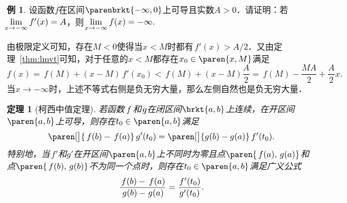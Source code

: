 \documentclass[a4paper,punct=CCT]{ctexbook}
\makeatletter
\newtheorem{theorem}{定理}
\theoremstyle{definition}
\newtheorem*{example*}{例}
\theoremstyle{remark}
\renewcommand*{\proofname}{证}
\renewenvironment{proof}[1][\proofname]{\par
  \pushQED{\qed}%
  \normalfont \topsep6\p@\@plus6\p@\relax
  \trivlist
  \item[\hskip\labelsep
    \bfseries
    #1%
    ]\ignorespaces
}{%
  \popQED\endtrivlist\@endpefalse
}
\makeatother
\begin{document}
\begin{example*}
  设函数\(f\)在区间\(\parenbrkt{-\infty,0}\)上可导且实数\(A > 0\)．请证明：若\(\negthickspace\lim\limits_{x\to-\infty} f'(x) = A\)，则
  \begin{math}
    \negthickspace\lim\limits_{x\to-\infty} f(x) = -\infty.
  \end{math}

  \begin{proof}
    由极限定义可知，存在\(M < 0\)使得当\(x < M\)时都有\(\,f'(x) > A/2\)．又由定理~\ref{thm:lmvt}可知，对于任意的\(x < M\)都存在\(x_0 \in \paren{x, M}\)满足
    \begin{equation*}
      f(x) = \,f(M) + (x - M)\,f'(x_0) < \,f(M) + (x - M) \frac A2 = \,f(M) - \frac{MA}{2} + \frac A2 x.
    \end{equation*}
    当\(x \to -\infty\)时，上述不等式右侧是负无穷大量，那么左侧自然也是负无穷大量．
  \end{proof}
\end{example*}

\begin{theorem}[柯西中值定理]
  \label{thm:cmvt}
  若函数\(\,f\mkern2mu\)和\(\mkern1mu g\)在闭区间\(\brkt{a,b}\)上连续，在开区间\(\paren{a,b}\)上可导，则存在\(t_0 \in \paren{a,b}\)满足
  \begin{equation*}
    \paren[\big]{\,f(b)-\,f(a)}\,g'(t_0) = \paren[\big]{g(b)-g(a)}\,f'(t_0).
  \end{equation*}
  特别地，当\(\,f'\!\)和\(g'\!\)在开区间\(\paren{a,b}\)上不同时为零且点\(\paren{\,f(a), \,g(a)}\)和点\(\paren{\,f(b), \,g(b)}\)不为同一个点时，则存在\(t_0 \in \paren{a,b}\)满足广义公式
  \begin{equation*}
    \frac{\,f(b)-\,f(a)}{\mkern2mu g(b)-\mkern1mu g(a)} = \frac{\mkern1mu f'(t_0)}{g'(t_0)}.
  \end{equation*}
\end{theorem}
\end{document}
